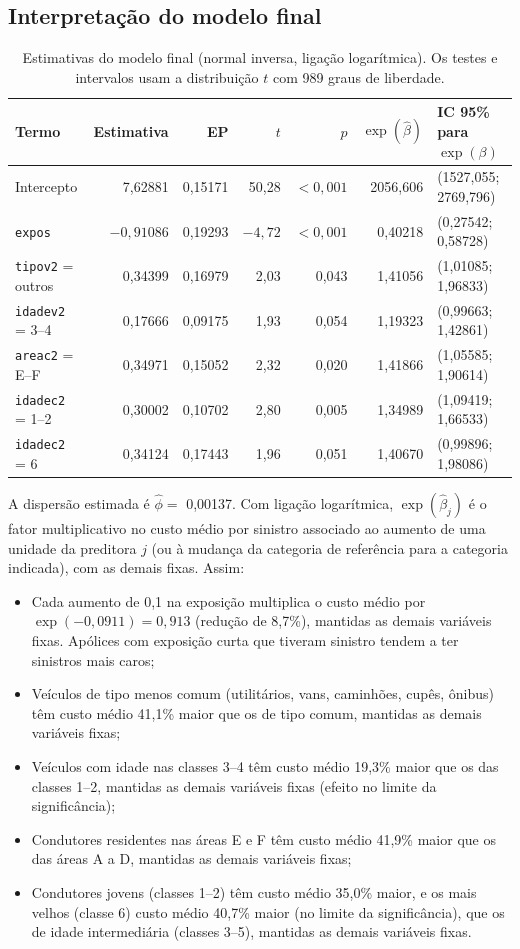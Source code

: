 \subsection*{Interpretação do modelo final}

\begin{table}[H]
\centering\small
\caption{Estimativas do modelo final (normal inversa, ligação logarítmica). Os testes e intervalos usam a distribuição $t$ com 989 graus de liberdade.}\label{tab:ex1coef}
\begin{tabular}{lrrrrrl}
\toprule
Termo & Estimativa & EP & $t$ & $p$ & $\exp(\hat\beta)$ & IC 95\% para $\exp(\beta)$ \\
\midrule
Intercepto & 7,62881 & 0,15171 & 50,28 & $<0{,}001$ & 2056,606 & (1527,055; 2769,796) \\
\texttt{expos} & $-0{,}91086$ & 0,19293 & $-4{,}72$ & $<0{,}001$ & 0,40218 & (0,27542; 0,58728) \\
\texttt{tipov2} = outros & 0,34399 & 0,16979 & 2,03 & 0,043 & 1,41056 & (1,01085; 1,96833) \\
\texttt{idadev2} = 3--4 & 0,17666 & 0,09175 & 1,93 & 0,054 & 1,19323 & (0,99663; 1,42861) \\
\texttt{areac2} = E--F & 0,34971 & 0,15052 & 2,32 & 0,020 & 1,41866 & (1,05585; 1,90614) \\
\texttt{idadec2} = 1--2 & 0,30002 & 0,10702 & 2,80 & 0,005 & 1,34989 & (1,09419; 1,66533) \\
\texttt{idadec2} = 6 & 0,34124 & 0,17443 & 1,96 & 0,051 & 1,40670 & (0,99896; 1,98086) \\
\bottomrule
\end{tabular}
\end{table}

A dispersão estimada é $\hat\phi=$ 0,00137. Com ligação logarítmica, $\exp(\hat\beta_j)$ é o fator multiplicativo no custo médio por sinistro associado ao aumento de uma unidade da preditora $j$ (ou à mudança da categoria de referência para a categoria indicada), com as demais fixas. Assim:
\begin{itemize}[noitemsep]
\item Cada aumento de 0,1 na exposição multiplica o custo médio por $\exp(-0{,}0911)=0{,}913$ (redução de 8,7\%), mantidas as demais variáveis fixas. Apólices com exposição curta que tiveram sinistro tendem a ter sinistros mais caros;
\item Veículos de tipo menos comum (utilitários, vans, caminhões, cupês, ônibus) têm custo médio 41,1\% maior que os de tipo comum, mantidas as demais variáveis fixas;
\item Veículos com idade nas classes 3--4 têm custo médio 19,3\% maior que os das classes 1--2, mantidas as demais variáveis fixas (efeito no limite da significância);
\item Condutores residentes nas áreas E e F têm custo médio 41,9\% maior que os das áreas A a D, mantidas as demais variáveis fixas;
\item Condutores jovens (classes 1--2) têm custo médio 35,0\% maior, e os mais velhos (classe 6) custo médio 40,7\% maior (no limite da significância), que os de idade intermediária (classes 3--5), mantidas as demais variáveis fixas.
\end{itemize}

